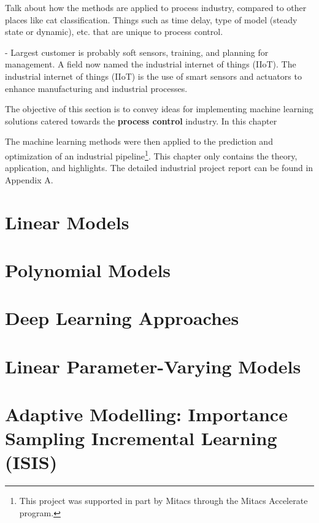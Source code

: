 Talk about how the methods are applied to process industry, compared to other places like cat classification.  Things such as time delay, type of model (steady state or dynamic), etc. that are unique to process control.

- Largest customer is probably soft sensors, training, and planning for management.  A field now named the industrial internet of things (IIoT). The industrial internet of things (IIoT) is the use of smart sensors and actuators to enhance manufacturing and industrial processes.

The objective of this section is to convey ideas for implementing machine learning solutions catered towards the \textbf{process control} industry.  In this chapter

The machine learning methods were then applied to the prediction and optimization of an industrial pipeline\footnote{This project was supported in part by Mitacs through the Mitacs Accelerate program.}. This chapter only contains the theory, application, and highlights. The detailed industrial project report can be found in Appendix A.

\section{Linear Models}

\section{Polynomial Models}

\section{Deep Learning Approaches}

\section{Linear Parameter-Varying Models}

\section{Adaptive Modelling: Importance Sampling Incremental Learning (ISIS)}
